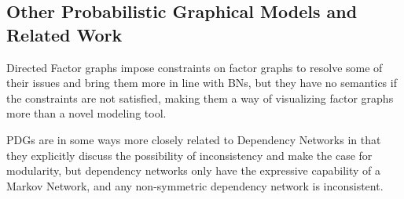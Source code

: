 \documentclass{article}
\theoremstyle{plain}
\theoremstyle{definition}
\theoremstyle{remark}
\newcommand{\todo}[1]{{\color{red}\ \!\Large\smash{\textbf{[}}{\normalsize\textsc{todo:} #1}\ \!\smash{\textbf{]}}}}
\numberwithin{equation}{section}
\begin{document}

	\subsection{Other Probabilistic Graphical Models and Related Work}
	Directed Factor graphs \cite{frey2012extending} impose constraints on factor graphs to resolve some of their issues and bring them more in line with BNs, but they have no semantics if the constraints are not satisfied, making them a way of visualizing factor graphs more than a novel modeling tool.

	PDGs are in some ways more closely related to Dependency Networks \cite{heckerman2000dependency} in that they explicitly discuss the possibility of inconsistency and make the case for modularity, but dependency networks only have the expressive capability of a Markov Network, and any non-symmetric dependency network is inconsistent.
	

\end{document}
